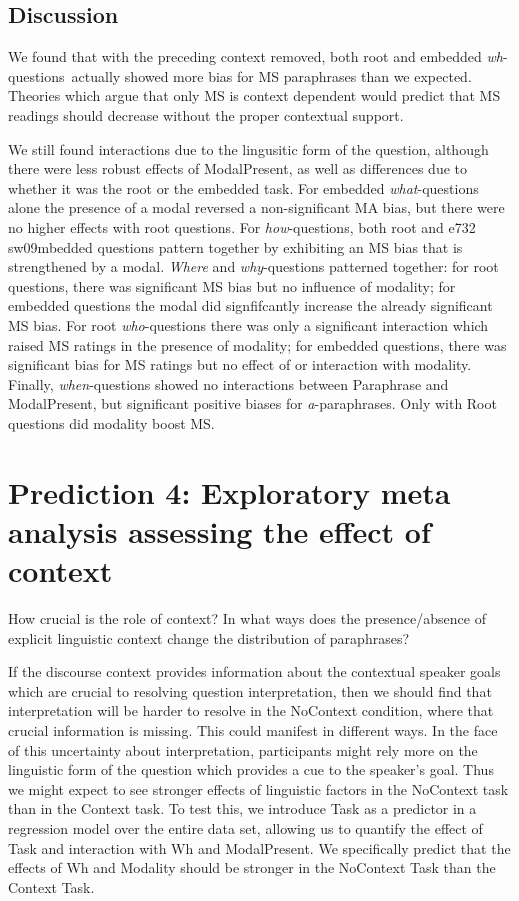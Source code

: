 \documentclass[12pt,letterpaper,table,svgnames,dvipsnames]{article}
\newcommand{\whqs}{\emph{wh}-questions~}
\begin{document}
\subsection{Discussion}
We found that with the preceding context removed, both root and embedded \whqs actually showed more bias for MS paraphrases than we expected. Theories which argue that only MS is context dependent would predict that MS readings should decrease without the proper contextual support. 

We still found interactions due to the lingusitic form of the question, although there were less robust effects of ModalPresent, as well as differences due to whether it was the root or the embedded task. For embedded \emph{what}-questions alone the presence of a modal reversed a non-significant MA bias, but there were no higher effects with root questions. For \emph{how}-questions, both root and e732 sw09mbedded questions pattern together by exhibiting an MS bias that is strengthened by a modal. \emph{Where} and \emph{why}-questions patterned together: for root questions, there was significant MS bias but no influence of modality; for embedded questions the modal did signfifcantly increase the already significant MS bias. For root \emph{who}-questions there was only a significant interaction which raised MS ratings in the presence of modality; for embedded questions, there was significant bias for MS ratings but no effect of or interaction with modality. Finally, \emph{when}-questions showed no interactions between Paraphrase and ModalPresent, but significant positive biases for \emph{a}-paraphrases. Only with Root questions did modality boost MS.





\section{Prediction 4: Exploratory meta analysis assessing the effect of context}
How crucial is the role of context? In what ways does the presence/absence of explicit linguistic context change the distribution of paraphrases? 

If the discourse context provides information about the contextual speaker goals which are crucial to resolving question interpretation, then we should find that interpretation will be harder to resolve in the NoContext condition, where that crucial information is missing. This could manifest in different ways. In the face of this uncertainty about interpretation, participants might rely more on the linguistic form of the question which provides a cue to the speaker's goal. Thus we might expect to see stronger effects of linguistic factors in the NoContext task than in the Context task. To test this, we introduce Task as a predictor in a regression model over the entire data set, allowing us to quantify the effect of Task and interaction with Wh and ModalPresent. We specifically predict that the effects of Wh and Modality should be stronger in the NoContext Task than the Context Task.
\end{document}

